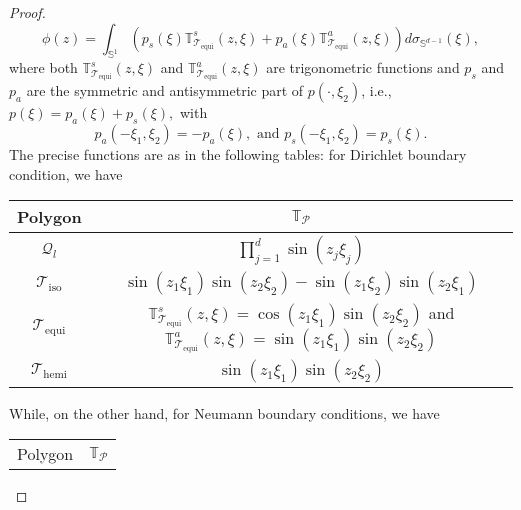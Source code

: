 \documentclass{amsart}
\theoremstyle{definition}
\theoremstyle{remark}
\newcommand{\si}{\sigma}
\numberwithin{equation}{section}
\theoremstyle{definition}
\theoremstyle{remark}
\begin{document}
\begin{proof}
\begin{equation}
		\phi(z)=\int_{\mathbb{S}^{1}}\left(p_s(\xi)\mathbb{T}_{	\mathcal{T}_\mathrm{equi}}^s(z,\xi)+p_a(\xi)\mathbb{T}_{	\mathcal{T}_\mathrm{equi}}^a(z,\xi)\right)d\si_{\mathbb{S}^{d-1}}(\xi),
	\end{equation}where both $\mathbb{T}_{	\mathcal{T}_\mathrm{equi}}^s(z,\xi)$ and $\mathbb{T}_{	\mathcal{T}_\mathrm{equi}}^a(z,\xi)$ are trigonometric functions and $p_s$ and $p_a $ are the symmetric and antisymmetric part of $p(\cdot,\xi_2)$, i.e., $p(\xi)=p_a(\xi)+p_s(\xi),$ with \begin{equation}
		 p_a(-\xi_1,\xi_2)=-p_a(\xi),\text{ and } p_s(-\xi_1,\xi_2)=p_s(\xi).
	\end{equation}
	The precise functions are as in the following tables: for Dirichlet boundary condition, we have  
	\begin{center}
		\begin{tabular}{cc} 
			\hline
			\rule{0pt}{3ex}Polygon & $\mathbb{T}_\mathcal{P}$ \\
			\hline
			 \rule{0pt}{3ex}$\mathcal{Q}_l$& $\prod_{j=1}^d\sin\left(z_j\xi_j\right)$\\
			 \rule{0pt}{3ex}$\mathcal{T}_\mathrm{iso}$ & $\sin\left(z_1\xi_1\right)\sin\left(z_2\xi_2\right)-\sin\left(z_1\xi_2\right)\sin\left(z_2\xi_1\right)$ \\
			
			 \rule{0pt}{3ex}$	\mathcal{T}_\mathrm{equi}$ & $\mathbb{T}_{	\mathcal{T}_\mathrm{equi}}^s(z,\xi)= \cos\left(z_1\xi_1\right)\sin\left(z_2\xi_2\right)$ and $\mathbb{T}_{	\mathcal{T}_\mathrm{equi}}^a(z,\xi)= \sin\left(z_1\xi_1\right)\sin\left(z_2\xi_2\right)$\\
			 \rule{0pt}{3ex}$\mathcal{T}_\mathrm{hemi}$ & $\sin\left(z_1\xi_1\right)\sin\left(z_2\xi_2\right)$ \\\hline
		\end{tabular} 
	\end{center}While, on the other hand, for Neumann boundary conditions, we have 
	\begin{center}
		\begin{tabular}{cc} 
			\hline
			\rule{0pt}{3ex}Polygon & $\mathbb{T}_\mathcal{P}$ \\
		

\end{tabular}
\end{center}
\end{proof}
\end{document}
